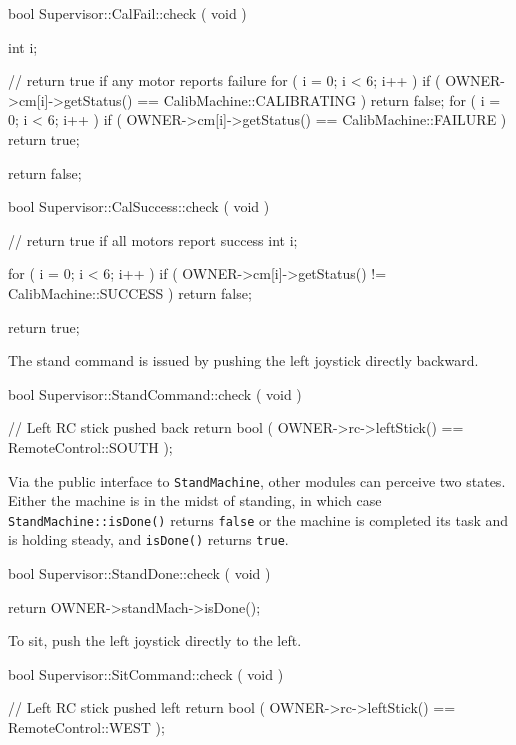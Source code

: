 \begin{codesegment}
bool Supervisor::CalFail::check ( void ) {

  int i;

  // return true if any motor reports failure
  for ( i = 0; i < 6; i++ )
    if ( OWNER->cm[i]->getStatus() == CalibMachine::CALIBRATING ) return false;
  for ( i = 0; i < 6; i++ )
    if ( OWNER->cm[i]->getStatus() == CalibMachine::FAILURE ) return true;
  
  return false;

}

bool Supervisor::CalSuccess::check ( void ) {

  // return true if all motors report success
  int i;

  for ( i = 0; i < 6; i++ )
    if ( OWNER->cm[i]->getStatus() != CalibMachine::SUCCESS ) return false;
  
  return true;

}
\end{codesegment}

\noindent The stand command is issued by pushing the left joystick directly backward.

\begin{codesegment}
bool Supervisor::StandCommand::check ( void ) { 

  // Left RC stick pushed back
  return bool ( OWNER->rc->leftStick() == RemoteControl::SOUTH );

}
\end{codesegment}

\noindent Via the public interface to {\tt StandMachine}, other modules can
perceive two states. Either the machine is in the midst of standing, in which
case {\tt StandMachine::isDone()} returns {\tt false} or the machine is
completed its task and is holding steady, and {\tt isDone()} returns {\tt true}.

\begin{codesegment}
bool Supervisor::StandDone::check ( void ) { 

  return OWNER->standMach->isDone();

}
\end{codesegment}

\noindent To sit, push the left joystick directly to the left.

\begin{codesegment}
bool Supervisor::SitCommand::check ( void ) {

  // Left RC stick pushed left
  return bool ( OWNER->rc->leftStick() == RemoteControl::WEST );

}
\end{codesegment}

